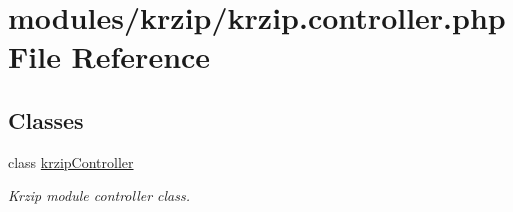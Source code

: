 \hypertarget{krzip_8controller_8php}{\section{modules/krzip/krzip.controller.\-php File Reference}
\label{krzip_8controller_8php}
}
\subsection*{Classes}
\begin{DoxyCompactItemize}
\item 
class \hyperlink{classkrzipController}{krzip\-Controller}
\begin{DoxyCompactList}\small\item\em Krzip module controller class. \end{DoxyCompactList}\end{DoxyCompactItemize}

